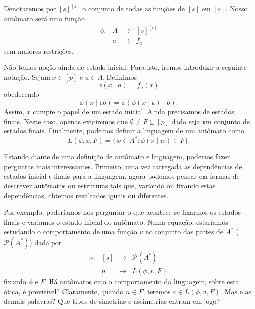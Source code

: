 \documentclass[11pt]{article}
\theoremstyle{plain}
\theoremstyle{nonumberplain}
\newcommand{\set}[1]{\{#1\}}
\newcommand{\ainf}{A^*}
\newcommand{\funcset}[1]{#1^{#1}}
\newcommand{\powerset}[1]{\mathcal{P}(#1)}
\begin{document}
Denotaremos por $\funcset{[s]}$ o conjunto de todas as funções de $[s]$ em $[s]$. Nosso autômato será uma função \begin{equation}
    \begin{array}{cccc}
        \phi : & A & \to & \funcset{[s]} \\
         & a & \mapsto & f_a
    \end{array}
\end{equation}
sem maiores restrições.

Não temos noção ainda de estado inicial. Para isto, iremos introduzir a seguinte notação.
Sejam $x \in [p]$ e $a \in A$. Definimos \begin{equation}
    \phi(x \mid a) = f_a(x)
\end{equation}
obedecendo \begin{equation}
    \phi(x \mid ab) = \phi(\phi(x \mid a) \mid b).
\end{equation}
Assim, $x$ cumpre o papel de um estado inicial. Ainda precisamos de estados finais.
Neste caso, apenas exigiremos que $\emptyset \neq F \subseteq [p]$ dado seja um 
conjunto de estados finais. Finalmente, podemos definir a linguagem de um autômato
como \begin{equation}
    L(\phi, x, F) = \set{w \in \ainf : \phi(x \mid w) \in F}.
\end{equation}

Estando diante de uma definição de autômato e linguagem, podemos fazer perguntas mais interessantes. Primeiro, uma vez carregada as dependências de estados inicial e finais para a linguagem, agora podemos pensar em formas de descrever autômatos ou estruturas tais que, variando ou fixando estas dependências, obtemos resultados iguais ou diferentes.

Por exemplo, poderíamos nos perguntar o que acontece se fixarmos os estados finais e variamos o estado inicial do autômato. Numa equação, estaríamos estudando o comportamento de uma função $v$ no conjunto das partes de $\ainf$ ($\powerset{\ainf}$) dada por \begin{equation}
    \begin{array}{cccc}
        v : & [s] & \to & \powerset{\ainf} \\
         & n & \mapsto & L(\phi, n, F)
    \end{array}
\end{equation}
fixando $\phi$ e $F$. Há autômatos cujo o comportamento da linguagem, sobre esta ótica, é previsível? Claramente, quando $n \in F$, teremos $\varepsilon \in L(\phi, n, F)$. Mas e as demais palavras? Que tipos de simetrias e assimetrias entram em jogo?
\end{document}
